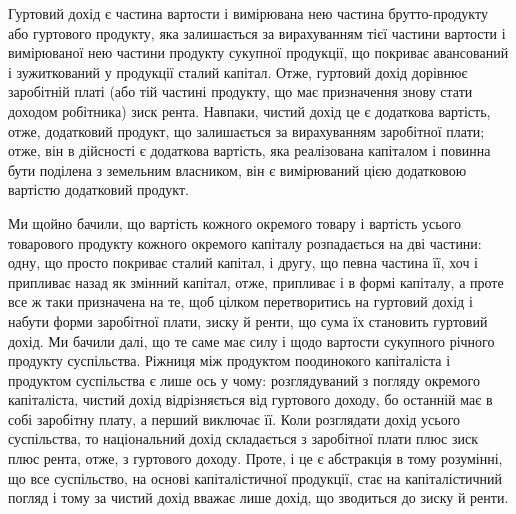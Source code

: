 
Гуртовий дохід є частина вартости і вимірювана нею частина брутто-продукту
або гуртового продукту, яка залишається за вирахуванням тієї частини
вартости і вимірюваної нею частини продукту сукупної продукції, що покриває
авансований і зужиткований у продукції сталий капітал. Отже, гуртовий дохід
дорівнює заробітній платі (або тій частині продукту, що має призначення знову
стати доходом робітника) \dplus{} зиск \dplus{} рента. Навпаки, чистий дохід це є додаткова
вартість, отже, додатковий продукт, що залишається за вирахуванням заробітної
плати; отже, він в дійсності є додаткова вартість, яка реалізована капіталом і
повинна бути поділена з земельним власником, він є вимірюваний цією додатковою
вартістю додатковий продукт.

Ми щойно бачили, що вартість кожного окремого товару і вартість усього
товарового продукту кожного окремого капіталу розпадається на дві частини:
одну, що просто покриває сталий капітал, і другу, що певна частина її, хоч і
припливає назад як змінний капітал, отже, припливає і в формі капіталу,
а проте все ж таки призначена на те, щоб цілком перетворитись на гуртовий
дохід і набути форми заробітної плати, зиску й ренти, що сума їх становить
гуртовий дохід. Ми бачили далі, що те саме має силу і щодо вартости сукупного
річного продукту суспільства. Ріжниця між продуктом поодинокого капіталіста
і продуктом суспільства є лише ось у чому: розглядуваний з погляду
окремого капіталіста, чистий дохід відрізняється від гуртового доходу, бо останній
має в собі заробітну плату, а перший виключає її. Коли розглядати дохід
усього суспільства, то національний дохід складається з заробітної плати плюс
зиск плюс рента, отже, з гуртового доходу. Проте, і це є абстракція в тому
розумінні, що все суспільство, на основі капіталістичної продукції, стає на капіталістичний
погляд і тому за чистий дохід вважає лише дохід, що зводиться
до зиску й ренти.

